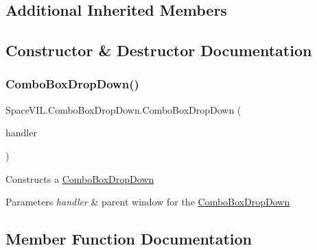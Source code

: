 \subsection*{Additional Inherited Members}


\subsection{Constructor \& Destructor Documentation}
\mbox{\label{class_space_v_i_l_1_1_combo_box_drop_down_a898ab2962be22a43b6d9910549b95a41}} 
\subsubsection{\texorpdfstring{Combo\+Box\+Drop\+Down()}{ComboBoxDropDown()}}
{\footnotesize\ttfamily Space\+V\+I\+L.\+Combo\+Box\+Drop\+Down.\+Combo\+Box\+Drop\+Down (\begin{DoxyParamCaption}\item[{\mbox{\hyperlink{class_space_v_i_l_1_1_window_layout}{Window\+Layout}}}]{handler }\end{DoxyParamCaption})}



Constructs a \mbox{\hyperlink{class_space_v_i_l_1_1_combo_box_drop_down}{Combo\+Box\+Drop\+Down}} 


\begin{DoxyParams}{Parameters}
{\em handler} & parent window for the \mbox{\hyperlink{class_space_v_i_l_1_1_combo_box_drop_down}{Combo\+Box\+Drop\+Down}} \\
\hline
\end{DoxyParams}


\subsection{Member Function Documentation}
\mbox{\label{class_space_v_i_l_1_1_combo_box_drop_down_aaaaf954c53c9e0adba384e25b66150a1}} 
